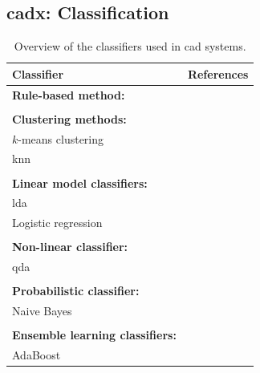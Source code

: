 \subsection{\acs*{cadx}: Classification} \label{subsec:chp3:img-clas:CADX-clas}


\begin{table}
  \caption{Overview of the classifiers used in \acs*{cad} systems.}
  \scriptsize
  \begin{tabularx}{\textwidth}{l >{\raggedleft\arraybackslash}X@{}}
    \toprule
    \textbf{Classifier} & \textbf{References} \\
    \midrule
    \textbf{Rule-based method:} & \cite{Lv2009,Puech2009} \\ \\ [-1.5ex]
    \textbf{Clustering methods:} & \\
    \quad $k$-means clustering & \cite{Tiwari2007,Tiwari2008,Tiwari2009} \\
    \quad \acs{knn} & \cite{Litjens2012,Niaf2011,Niaf2012,rampun2016computerb} \\ \\ [-1.5ex]
    \textbf{Linear model classifiers:} & \\
    \quad \acs{lda} & \cite{Antic2013,Chan2003,Litjens2014,Niaf2011,Niaf2012,Vos2012} \\
    \quad Logistic regression & \cite{Kelm2007,Langer2009,lehaire2014computer,rampun2015computer} \\ \\ [-1.5ex]
    \textbf{Non-linear classifier:} & \\
    \quad \acs{qda} & \cite{Viswanath2012} \\ \\ [-1.5ex]
    \textbf{Probabilistic classifier:} & \\
    \quad Naive Bayes & \cite{Giannini2013,Mazzetti2011,Niaf2011,Niaf2012,cameron2014multiparametric,cameron2016maps,rampun2015classifying,rampun2016computerb,rampun2015computer,rampun2016computer} \\ \\ [-1.5ex]
    \textbf{Ensemble learning classifiers:} & \\
    \quad AdaBoost & \cite{Litjens2014,Lopes2011} \\

\end{tabularx}
\end{table}
